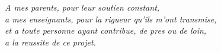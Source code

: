 \thispagestyle{empty}
\vspace*{4cm}
\begin{flushright}
\textit{A mes parents, pour leur soutien constant,\\
a mes enseignants, pour la rigueur qu'ils m'ont transmise,\\
et a toute personne ayant contribue, de pres ou de loin,\\
a la reussite de ce projet.}
\end{flushright}
\clearpage
